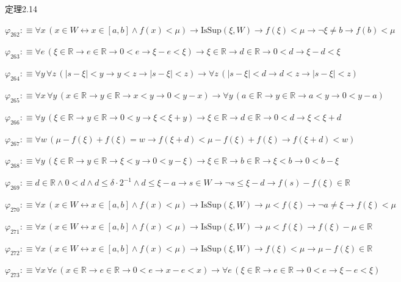 \begin{fullproof}{定理2.14}
\begin{abbrevlist}
\item $\varphi_{262} :\equiv \forall x\,(x \in W \leftrightarrow x \in [a,b] \land f(x) < \mu) \to \mathrm{IsSup}(\xi,W) \to f(\xi) < \mu \to \neg \xi \neq b \to f(b) < \mu$
\item $\varphi_{263} :\equiv \forall e\,(\xi \in \mathbb{R} \to e \in \mathbb{R} \to 0 < e \to \xi - e < \xi) \to \xi \in \mathbb{R} \to d \in \mathbb{R} \to 0 < d \to \xi - d < \xi$
\item $\varphi_{264} :\equiv \forall y\,\forall z\,(\lvert s - \xi \rvert < y \to y < z \to \lvert s - \xi \rvert < z) \to \forall z\,(\lvert s - \xi \rvert < d \to d < z \to \lvert s - \xi \rvert < z)$
\item $\varphi_{265} :\equiv \forall x\,\forall y\,(x \in \mathbb{R} \to y \in \mathbb{R} \to x < y \to 0 < y - x) \to \forall y\,(a \in \mathbb{R} \to y \in \mathbb{R} \to a < y \to 0 < y - a)$
\item $\varphi_{266} :\equiv \forall y\,(\xi \in \mathbb{R} \to y \in \mathbb{R} \to 0 < y \to \xi < \xi + y) \to \xi \in \mathbb{R} \to d \in \mathbb{R} \to 0 < d \to \xi < \xi + d$
\item $\varphi_{267} :\equiv \forall w\,(\mu - f(\xi) + f(\xi) = w \to f(\xi + d) < \mu - f(\xi) + f(\xi) \to f(\xi + d) < w)$
\item $\varphi_{268} :\equiv \forall y\,(\xi \in \mathbb{R} \to y \in \mathbb{R} \to \xi < y \to 0 < y - \xi) \to \xi \in \mathbb{R} \to b \in \mathbb{R} \to \xi < b \to 0 < b - \xi$
\item $\varphi_{269} :\equiv d \in \mathbb{R} \land 0 < d \land d \leq \delta \cdot 2^{-1} \land d \leq \xi - a \to s \in W \to \neg s \leq \xi - d \to f(s) - f(\xi) \in \mathbb{R}$
\item $\varphi_{270} :\equiv \forall x\,(x \in W \leftrightarrow x \in [a,b] \land f(x) < \mu) \to \mathrm{IsSup}(\xi,W) \to \mu < f(\xi) \to \neg a \neq \xi \to f(\xi) < \mu$
\item $\varphi_{271} :\equiv \forall x\,(x \in W \leftrightarrow x \in [a,b] \land f(x) < \mu) \to \mathrm{IsSup}(\xi,W) \to \mu < f(\xi) \to f(\xi) - \mu \in \mathbb{R}$
\item $\varphi_{272} :\equiv \forall x\,(x \in W \leftrightarrow x \in [a,b] \land f(x) < \mu) \to \mathrm{IsSup}(\xi,W) \to f(\xi) < \mu \to \mu - f(\xi) \in \mathbb{R}$
\item $\varphi_{273} :\equiv \forall x\,\forall e\,(x \in \mathbb{R} \to e \in \mathbb{R} \to 0 < e \to x - e < x) \to \forall e\,(\xi \in \mathbb{R} \to e \in \mathbb{R} \to 0 < e \to \xi - e < \xi)$

\end{abbrevlist}
\end{fullproof}
